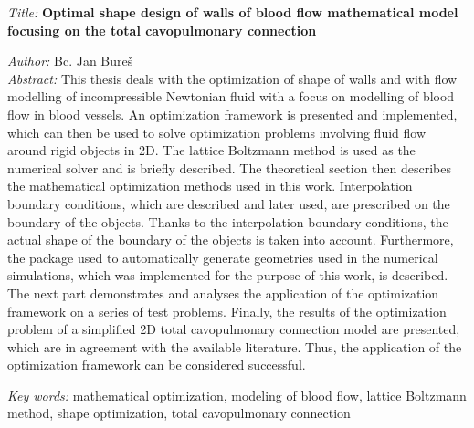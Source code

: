 %
\begin{onehalfspace}
\noindent \emph{Title:}
\noindent \textbf{Optimal shape design of walls of blood flow mathematical model focusing on the total cavopulmonary connection}
\end{onehalfspace}
\noindent \emph{Author:} Bc. Jan Bureš\\[2pt]
\noindent \emph{Abstract:} This thesis deals with the optimization of shape of walls and with flow modelling of incompressible Newtonian fluid with a focus on modelling of blood flow in blood vessels. An optimization framework is presented and implemented, which can then be used to solve optimization problems involving fluid flow around rigid objects in 2D. The lattice Boltzmann method is used as the numerical solver and is briefly described. The theoretical section then describes the mathematical optimization methods used in this work. Interpolation boundary conditions, which are described and later used, are prescribed on the boundary of the objects. Thanks to the interpolation boundary conditions, the actual shape of the boundary of the objects is taken into account. Furthermore, the package used to automatically generate geometries used in the numerical simulations, which was implemented for the purpose of this work, is described. The next part demonstrates and analyses the application of the optimization framework on a series of test problems. Finally, the results of the optimization problem of a simplified 2D total cavopulmonary connection model are presented, which are in agreement with the available literature. Thus, the application of the optimization framework can be considered successful.

\bigskip{}

\noindent \emph{Key words:} mathematical optimization, modeling of blood flow, lattice Boltzmann method, shape optimization, total cavopulmonary connection
%